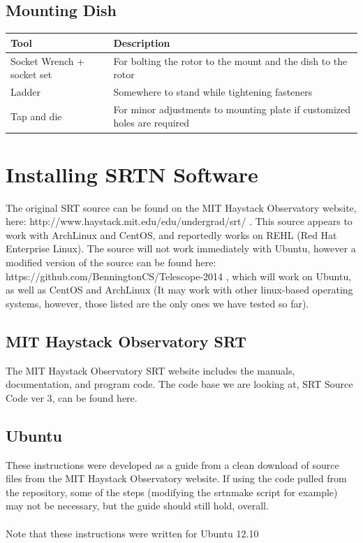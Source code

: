 \documentclass[11pt]{article} %
\begin{document}
\subsection{Mounting Dish}

\begin{tabular}{| l | p{10cm} |}
\hline
\textbf{Tool} & \textbf{Description} \\ \hline \hline
Socket Wrench + socket set & For bolting the rotor to the mount and the dish to the rotor \\ \hline
Ladder & Somewhere to stand while tightening fasteners \\ \hline
Tap and die & For minor adjustments to mounting plate if customized holes are required \\ \hline
\end{tabular}

\newpage
\section{Installing SRTN Software}

The original SRT source can be found on the MIT Haystack Observatory website, here: http://www.haystack.mit.edu/edu/undergrad/srt/ . This source appears to work with ArchLinux and CentOS, and reportedly works on REHL (Red Hat Enterprise Linux). The source will not work immediately with Ubuntu, however a modified version of the source can be found here: https://github.com/BenningtonCS/Telescope-2014 , which will work on Ubuntu, as well as CentOS and ArchLinux (It may work with other linux-based operating systems, however, those listed are the only ones we have tested so far). 

\subsection{MIT Haystack Observatory SRT}
The MIT Haystack Observatory SRT website includes the manuals, documentation, and program code. The code base we are looking at, SRT Source Code ver 3, can be found here.

\subsection{Ubuntu}


These instructions were developed as a guide from a clean download of source files from the MIT Haystack Observatory website. If using the code pulled from the repository, some of the steps (modifying the srtnmake script for example) may not be necessary, but the guide should still hold, overall.
\\ \\
Note that these instructions were written for Ubuntu 12.10
\end{document}
